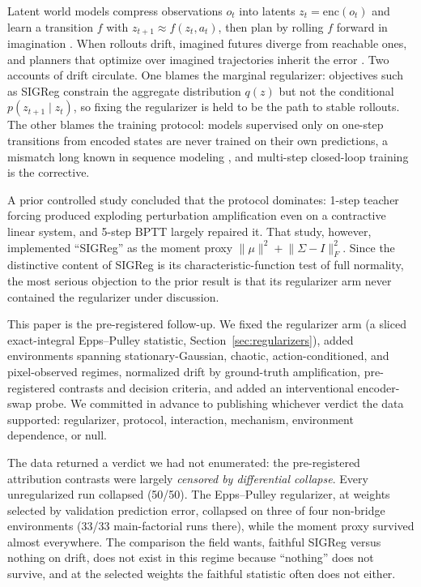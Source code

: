 \documentclass{article}
\begin{document}
Latent world models compress observations $o_t$ into latents $z_t=\mathrm{enc}(o_t)$ and learn a transition $f$ with $z_{t+1}\approx f(z_t,a_t)$, then plan by rolling $f$ forward in imagination \citep{hafner2023dreamerv3,lecun2022path}. When rollouts drift, imagined futures diverge from reachable ones, and planners that optimize over imagined trajectories inherit the error \citep{zhou2024dinowm,sobal2025planning}. Two accounts of drift circulate. One blames the marginal regularizer: objectives such as SIGReg \citep{balestriero2025lejepa} constrain the aggregate distribution $q(z)$ but not the conditional $p(z_{t+1}\mid z_t)$, so fixing the regularizer is held to be the path to stable rollouts. The other blames the training protocol: models supervised only on one-step transitions from encoded states are never trained on their own predictions, a mismatch long known in sequence modeling \citep{lamb2016professor}, and multi-step closed-loop training is the corrective.

A prior controlled study \citep{anon2026drift} concluded that the protocol dominates: 1-step teacher forcing produced exploding perturbation amplification even on a contractive linear system, and 5-step BPTT largely repaired it. That study, however, implemented ``SIGReg'' as the moment proxy $\lVert\mu\rVert^2+\lVert\Sigma-I\rVert_F^2$. Since the distinctive content of SIGReg is its characteristic-function test of full normality, the most serious objection to the prior result is that its regularizer arm never contained the regularizer under discussion.

This paper is the pre-registered follow-up. We fixed the regularizer arm (a sliced exact-integral Epps--Pulley statistic, Section~\ref{sec:regularizers}), added environments spanning stationary-Gaussian, chaotic, action-conditioned, and pixel-observed regimes, normalized drift by ground-truth amplification, pre-registered contrasts and decision criteria, and added an interventional encoder-swap probe. We committed in advance to publishing whichever verdict the data supported: regularizer, protocol, interaction, mechanism, environment dependence, or null.

The data returned a verdict we had not enumerated: the pre-registered attribution contrasts were largely \emph{censored by differential collapse}. Every unregularized run collapsed (50/50). The Epps--Pulley regularizer, at weights selected by validation prediction error, collapsed on three of four non-bridge environments (33/33 main-factorial runs there), while the moment proxy survived almost everywhere. The comparison the field wants, faithful SIGReg versus nothing on drift, does not exist in this regime because ``nothing'' does not survive, and at the selected weights the faithful statistic often does not either.
\end{document}
